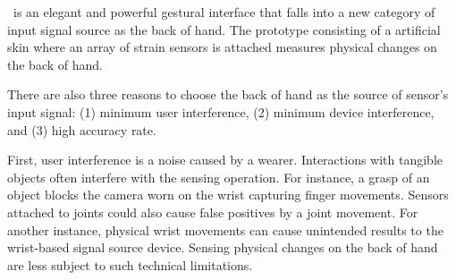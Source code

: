 \documentclass{sigchi}
\begin{document}







 
 

\getTitleName\ is an elegant and powerful gestural interface that falls into a new category of input signal source as the back of hand. The prototype consisting of a artificial skin where an array of strain sensors is attached measures physical changes on the back of hand.


There are also three reasons to choose the back of hand as the source of sensor's input signal: (1) minimum user interference, (2) minimum device interference, and (3) high accuracy rate. 

First, user interference is a noise caused by a wearer. Interactions with tangible objects often interfere with the sensing operation.
For instance, a grasp of an object blocks the camera worn on the wrist capturing finger movements.
Sensors attached to joints could also cause false positives by a joint movement.
For another instance, physical wrist movements can cause unintended results to the wrist-based signal source device. Sensing physical changes on the back of hand are less subject to such technical limitations. 
\end{document}
